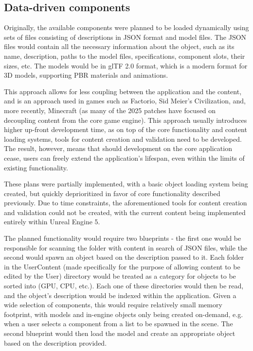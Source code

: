 \subsection{Data-driven components}
\label{sec:DataDrivenComponents}

Originally, the available components were planned to be loaded dynamically using sets of files consisting of descriptions in JSON \cite{brayRFC8259JavaScript2017} format and model files.
The JSON files would contain all the necessary information about the object, such as its name, description, paths to the model files, specifications, component slots, their sizes, etc. 
The models would be in glTF 2.0 \cite{ISOIEC12113} format, which is a modern format for 3D models, supporting PBR materials and animations.

This approach allows for less coupling between the application and the content, and is an approach used in games such as Factorio, Sid Meier's Civilization, and, more recently, Minecraft (as many of the 2025 patches have focused on decoupling content from the core game engine).
This approach usually introduces higher up-front development time, as on top of the core functionality and content loading systems, tools for content creation and validation need to be developed.
The result, however, means that should development on the core application cease, users can freely extend the application's lifespan, even within the limits of existing functionality.

These plans were partially implemented, with a basic object loading system being created, but quickly deprioritized in favor of core functionality described previously.
Due to time constraints, the aforementioned tools for content creation and validation could not be created, with the current content being implemented entirely within Unreal Engine 5.

The planned functionality would require two blueprints - the first one would be responsible for scanning the folder with content in search of JSON files, while the second would spawn an object based on the description passed to it.
Each folder in the UserContent (made specifically for the purpose of allowing content to be edited by the User) directory would be treated as a category for objects to be sorted into (GPU, CPU, etc.).
Each one of these directories would then be read, and the object's description would be indexed within the application.
Given a wide selection of components, this would require relatively small memory footprint, with models and in-engine objects only being created on-demand, e.g. when a user selects a component from a list to be spawned in the scene.
The second blueprint would then load the model and create an appropriate object based on the description provided.

